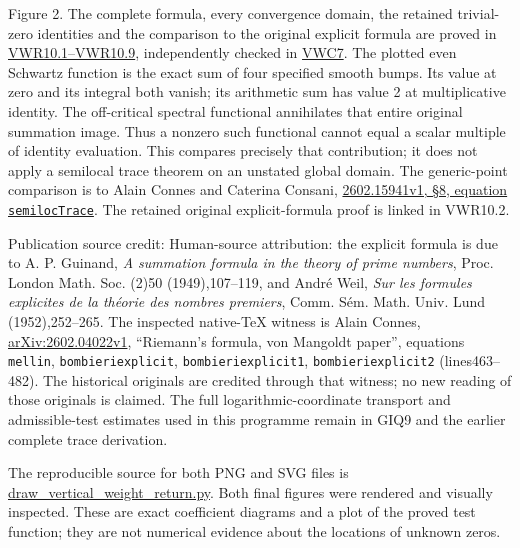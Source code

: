 Figure 2. The complete formula, every convergence domain, the retained
trivial-zero identities and the comparison to the original explicit
formula are proved in
\href{https://github.com/KokunoYumeto/zeta-function-research-reader/blob/main/workbenches/splitzero-tandem/continuations/20260925-full-source-tensor-and-original-divisor/counterfactual/FULL_VERTICAL_WEIGHT_RETURN.md}{VWR10.1--VWR10.9},
independently checked in
\href{https://github.com/KokunoYumeto/zeta-function-research-reader/blob/main/workbenches/splitzero-tandem/continuations/20260925-full-source-tensor-and-original-divisor/counterfactual/FULL_VERTICAL_WEIGHT_RETURN_INDEPENDENT_CHECK.md}{VWC7}.
The plotted even Schwartz function is the exact sum of four specified
smooth bumps. Its value at zero and its integral both vanish; its
arithmetic sum has value 2 at multiplicative identity. The off-critical
spectral functional annihilates that entire original summation image.
Thus a nonzero such functional cannot equal a scalar multiple of
identity evaluation. This compares precisely that contribution; it does
not apply a semilocal trace theorem on an unstated global domain. The
generic-point comparison is to Alain Connes and Caterina Consani,
\href{https://arxiv.org/abs/2602.15941v1}{2602.15941v1, §8, equation
\texttt{semilocTrace}}. The retained original explicit-formula proof is
linked in VWR10.2.

Publication source credit: Human-source attribution: the explicit
formula is due to A. P. Guinand, \emph{A summation formula in the theory
of prime numbers}, Proc. London Math. Soc. (2)50 (1949),107--119, and
André Weil, \emph{Sur les formules explicites de la théorie des nombres
premiers}, Comm. Sém. Math. Univ. Lund (1952),252--265. The inspected
native-TeX witness is Alain Connes,
\href{https://arxiv.org/abs/2602.04022v1}{arXiv:2602.04022v1},
``Riemann's formula, von Mangoldt paper'', equations \texttt{mellin},
\texttt{bombieriexplicit}, \texttt{bombieriexplicit1},
\texttt{bombieriexplicit2} (lines463--482). The historical originals are
credited through that witness; no new reading of those originals is
claimed. The full logarithmic-coordinate transport and admissible-test
estimates used in this programme remain in GIQ9 and the earlier complete
trace derivation.

The reproducible source for both PNG and SVG files is
\url{draw_vertical_weight_return.py}. Both final figures were rendered
and visually inspected. These are exact coefficient diagrams and a plot
of the proved test function; they are not numerical evidence about the
locations of unknown zeros.

